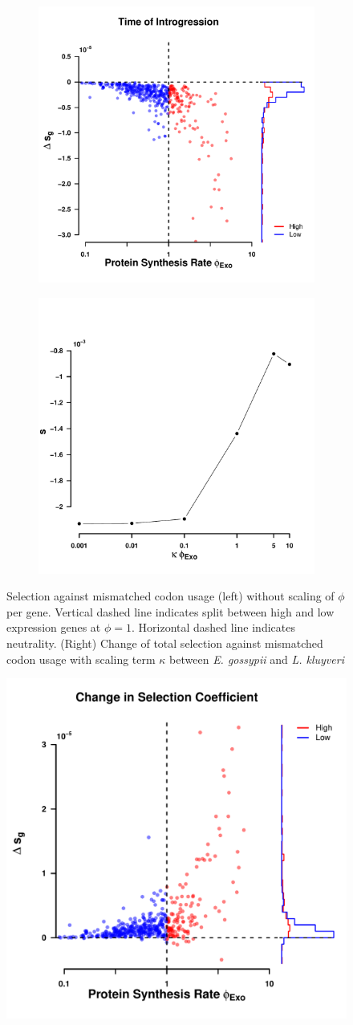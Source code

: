 \documentclass[doublespacing,linenumbers]{bmcart-modified}
\newcommand{\kluyveri}{\textit{L. kluyveri}\xspace}
\newcommand{\gossypii}{\textit{E. gossypii}\xspace}
\begin{document}
\begin{backmatter}
\begin{figure}
    \centering
    \begin{subfigure}
        \centering
        \includegraphics[width=.45\textwidth]{img/figS7a.pdf}%
    \end{subfigure}
    \begin{subfigure}
        \centering
        \includegraphics[width=.45\textwidth]{img/figS7b.pdf}%
    \end{subfigure}
    \caption{Selection against mismatched codon usage (left) without scaling of $\phi$ per gene. 
    Vertical dashed line indicates split between high and low expression genes at $\phi = 1$.
    Horizontal dashed line indicates neutrality.
     (Right) Change of total selection against mismatched codon usage with scaling term $\kappa$ between \gossypii and \kluyveri}
    \label{fig:sne_scaling}
\end{figure}
\null
\vfill
\null
\vfill
\begin{figure}
     \centering
	\includegraphics[width=.5\textwidth]{img/figS8.pdf}%

\end{figure}
\end{backmatter}
\end{document}
